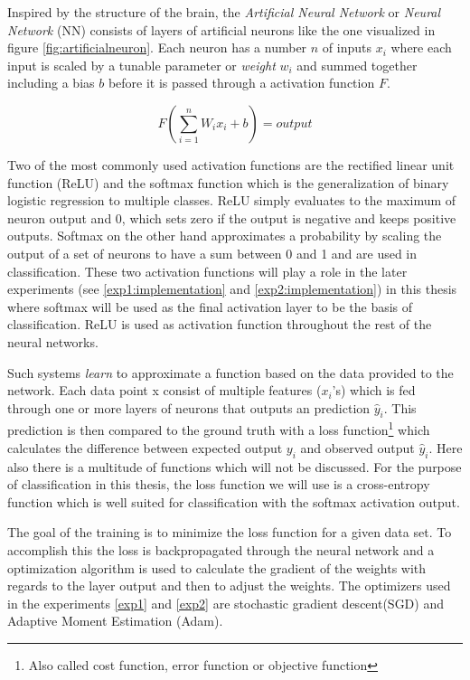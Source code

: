 Inspired by the structure of the brain, the \textit{Artificial Neural Network} or \textit{Neural Network} (NN) consists of layers of artificial neurons like the one visualized in figure \ref{fig:artificialneuron}. Each neuron has a number \(n\) of inputs \(x_{i}\) where each input is scaled by a tunable parameter or \textit{weight} \(w_{i}\) and summed together including a bias \(b\) before it is passed through a activation function \(F\).

\begin{equation}
    F(\sum_{i=1}^{n}W_{i}x_{i} + b) = output
\end{equation}

Two of the most commonly used activation functions are the rectified linear unit function (ReLU) and the softmax function which is the generalization of binary logistic regression to multiple classes. ReLU simply evaluates to the maximum of neuron output and 0, which sets zero if the output is negative and keeps positive outputs. Softmax on the other hand approximates a probability by scaling the output of a set of neurons to have a sum between 0 and 1 and are used in classification. These two activation functions will play a role in the later experiments (see \ref{exp1:implementation} and \ref{exp2:implementation}) in this thesis where softmax will be used as the final activation layer to be the basis of classification. ReLU is used as activation function throughout the rest of the neural networks. 

Such systems \textit{learn} to approximate a function based on the data provided to the network. Each data point x consist of multiple features (\(x_{i}\)'s) which is fed through one or more layers of neurons that outputs an prediction \(\hat{y}_{i}\). This prediction is then compared to the ground truth with a loss function\footnote{Also called cost function, error function or objective function} which calculates the difference between expected output \(y_{i}\) and observed output \(\hat{y}_{i}\). Here also there is a multitude of functions which will not be discussed. For the purpose of classification in this thesis, the loss function we will use is a cross-entropy function which is well suited for classification with the softmax activation output\cite{softmaxcrossentropy}.

The goal of the training is to minimize the loss function for a given data set. To accomplish this the loss is backpropagated through the neural network and a optimization algorithm is used to calculate the gradient of the weights with regards to the layer output and then to adjust the weights. The optimizers used in the experiments \ref{exp1} and \ref{exp2} are stochastic gradient descent(SGD)\cite{sgd} and Adaptive Moment Estimation (Adam)\cite{adam}. 

